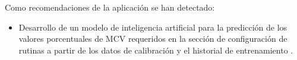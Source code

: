 \begin{recommendations}
    Como recomendaciones de la aplicación se han detectado:
    \begin{itemize}
        \item Desarrollo de un modelo de inteligencia artificial para la predicción de los valores porcentuales de MCV requeridos en la 
        sección de configuración de rutinas a partir de los datos de calibración y el historial de entrenamiento
        .
    \end{itemize}
\end{recommendations}